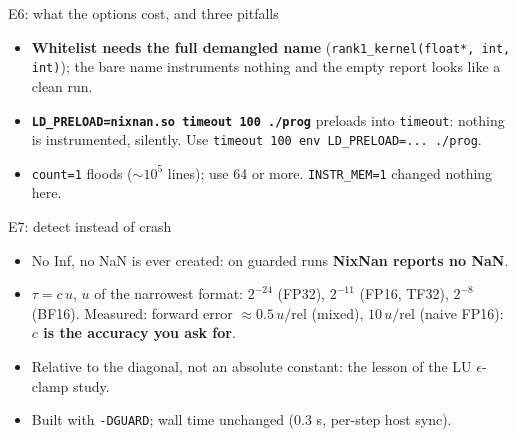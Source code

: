 \documentclass[aspectratio=169,10pt,xcolor=table]{beamer}
\begin{document}
\begin{frame}{E6: what the options cost, and three pitfalls}
\centering\scriptsize


\vspace{2mm}\raggedright\footnotesize
\begin{itemize}
\item \textbf{Whitelist needs the full demangled name} (\texttt{rank1\_kernel(float*, int, int)}); the bare name instruments nothing and the empty report looks like a clean run.
\item \textbf{\texttt{LD\_PRELOAD=nixnan.so timeout 100 ./prog}} preloads into \texttt{timeout}: nothing is instrumented, silently. Use \texttt{timeout 100 env LD\_PRELOAD=... ./prog}.
\item \texttt{count=1} floods ($\sim10^{5}$ lines); use 64 or more. \texttt{INSTR\_MEM=1} changed nothing here.
\end{itemize}
\end{frame}

\begin{frame}{E7: detect instead of crash}
\footnotesize
\centering
{}

\vspace{2mm}\raggedright
\begin{itemize}
\item No Inf, no NaN is ever created: on guarded runs \textbf{NixNan reports no NaN}.
\item $\tau=c\,u$, $u$ of the narrowest format: $2^{-24}$ (FP32), $2^{-11}$ (FP16, TF32), $2^{-8}$ (BF16). Measured: forward error $\approx0.5\,u/\mathrm{rel}$ (mixed), $10\,u/\mathrm{rel}$ (naive FP16): \textbf{$c$ is the accuracy you ask for}.
\item Relative to the diagonal, not an absolute constant: the lesson of the LU $\epsilon$-clamp study.
\item Built with \texttt{-DGUARD}; wall time unchanged (0.3 s, per-step host sync).
\end{itemize}
\end{frame}
\end{document}
